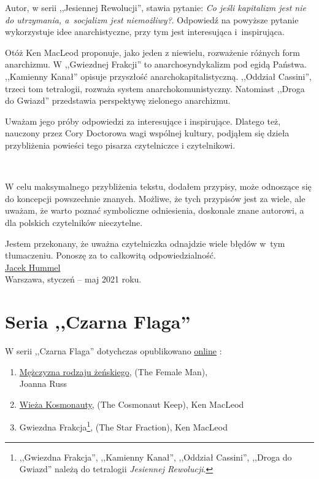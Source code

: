\documentclass[oneside,polish,11pt,sfheadings]{mwbk}
\begin{document}
Autor, w serii ,,Jesiennej Rewolucji'', stawia pytanie: 
\emph{Co jeśli kapitalizm jest nie do utrzymania, a~socjalizm jest niemożliwy?}. Odpowiedź na powyższe pytanie wykorzystuje idee anarchistyczne, przy tym jest interesująca i~inspirująca.

Otóż Ken MacLeod proponuje, jako jeden z niewielu, rozważenie różnych form anarchizmu. W ,,Gwiezdnej Frakcji'' to anarchosyndykalizm pod egidą Państwa. ,,Kamienny Kanał'' opisuje przyszłość anarchokapitalistyczną. ,,Oddział Cassini'', trzeci tom tetralogii, rozważa system anarchokomunistyczny. Natomiast ,,Droga do Gwiazd'' przedstawia perspektywę zielonego anarchizmu.

Uważam jego próby odpowiedzi za interesujące i inspirujące. Dlatego też, nauczony przez Cory Doctorowa wagi wspólnej kultury, podjąłem się dzieła przybliżenia powieści tego pisarza czytelniczce i czytelnikowi.

~

W celu maksymalnego przybliżenia tekstu, dodałem przypisy, może odnoszące się do koncepcji powszechnie znanych. Możliwe, że tych przypisów jest za wiele, ale uważam, że warto poznać symboliczne odniesienia, doskonale znane autorowi, a dla polskich czytelników nieczytelne.

Jestem przekonany, że uważna czytelniczka odnajdzie wiele błędów w~tym tłumaczeniu. Ponoszę za to całkowitą odpowiedzialność.\\

\href{mailto:theskymyladythesky@zoho.eu}{Jacek Hummel}\\

Warszawa, styczeń -- maj 2021 roku.


\chapter*{Seria ,,Czarna Flaga''}

\begin{center}
\begin{large}
W serii ,,Czarna Flaga'' dotychczas opublikowano 
\href{https://archive.org/details/@j_hummel?and[]=year\%3A\%222021\%22}{online}
:
\end{large} 
\end{center}


\begin{enumerate}
\item \href{https://archive.org/details/joanna-russ-mezczyzna-rodzaju-zenskiego/Joanna_Russ_M\%C4\%99\%C5\%BCczyzna_rodzaju_\%C5\%BCe\%C5\%84skiego}{Mężczyzna rodzaju żeńskiego}, (The Female Man),\\ Joanna Russ
\item \href{https://archive.org/details/ken-macleod-wieza-kosmonauty}{Wieża Kosmonauty}, (The Cosmonaut Keep), Ken MacLeod
\item Gwiezdna Frakcja\footnote{,,Gwiezdna Frakcja'', ,,Kamienny Kanał'', ,,Oddział Cassini'', ,,Droga do Gwiazd'' należą do tetralogii \emph{Jesiennej Rewolucji}.}, (The Star Fraction),	 Ken MacLeod
\end{enumerate}
\end{document}
